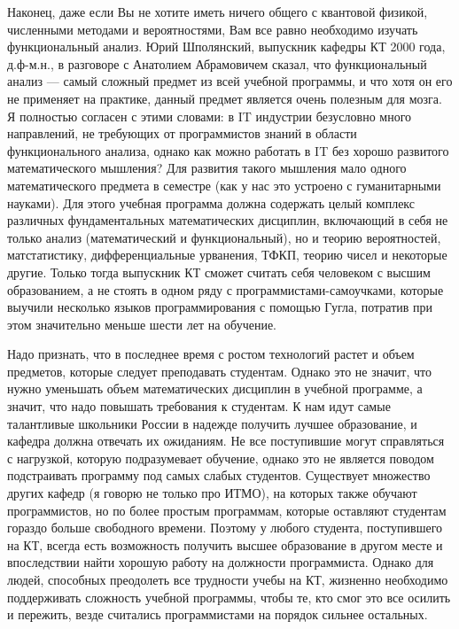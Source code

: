 \documentclass[russian]{article}
\begin{document}
Наконец, даже если Вы не хотите иметь ничего общего с квантовой физикой, численными методами и вероятностями, Вам все равно необходимо изучать функциональный анализ. Юрий Шполянский, выпускник кафедры КТ 2000 года, д.ф-м.н., в разговоре с Анатолием Абрамовичем сказал, что функциональный анализ --- самый сложный предмет из всей учебной программы, и что хотя он его не применяет на практике, данный предмет является очень полезным для мозга. Я полностью согласен с этими словами: в IT индустрии безусловно много направлений, не требующих от программистов знаний в области функционального анализа, однако как можно работать в IT без хорошо развитого математического мышления? Для развития такого мышления мало одного математического предмета в семестре (как у нас это устроено с гуманитарными науками). Для этого учебная программа должна содержать целый комплекс различных фундаментальных математических дисциплин, включающий в себя не только анализ (математический и функциональный), но и теорию вероятностей, матстатистику, дифференциальные урванения, ТФКП, теорию чисел и некоторые другие. Только тогда выпускник КТ сможет считать себя человеком с высшим образованием, а не стоять в одном ряду с программистами-самоучками, которые выучили несколько языков программирования с помощью Гугла, потратив при этом значительно меньше шести лет на обучение.

Надо признать, что в последнее время с ростом технологий растет и объем предметов, которые следует преподавать студентам. Однако это не значит, что нужно уменьшать объем математических дисциплин в учебной программе, а значит, что надо повышать требования к студентам. К нам идут самые талантливые школьники России в надежде получить лучшее образование, и кафедра должна отвечать их ожиданиям. Не все поступившие могут справляться с нагрузкой, которую подразумевает обучение, однако это не является поводом подстраивать программу под самых слабых студентов. Существует множество других кафедр (я говорю не только про ИТМО), на которых также обучают программистов, но по более простым программам, которые оставляют студентам гораздо больше свободного времени. Поэтому у любого студента, поступившего на КТ, всегда есть возможность получить высшее образование в другом месте и впоследствии найти хорошую работу на должности программиста. Однако для людей, способных преодолеть все трудности учебы на КТ, жизненно необходимо поддерживать сложность учебной программы, чтобы те, кто смог это все осилить и пережить, везде считались программистами на порядок сильнее остальных.
\end{document}
